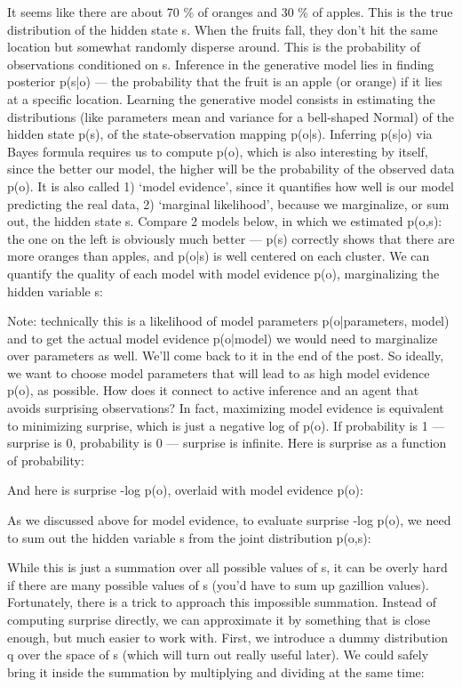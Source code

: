 \documentclass[12pt]{article}
\begin{document}
It seems like there are about 70 \% of oranges and 30 \% of apples. This is the true distribution of the hidden state s. When the fruits fall, they don’t hit the same location but somewhat randomly disperse around. This is the probability of observations conditioned on s. Inference in the generative model lies in finding posterior p(s|o) — the probability that the fruit is an apple (or orange) if it lies at a specific location. Learning the generative model consists in estimating the distributions (like parameters mean and variance for a bell-shaped Normal) of the hidden state p(s), of the state-observation mapping p(o|s). Inferring p(s|o) via Bayes formula requires us to compute p(o), which is also interesting by itself, since the better our model, the higher will be the probability of the observed data p(o). It is also called 1) ‘model evidence’, since it quantifies how well is our model predicting the real data, 2) ‘marginal likelihood’, because we marginalize, or sum out, the hidden state s. Compare 2 models below, in which we estimated p(o,s): the one on the left is obviously much better — p(s) correctly shows that there are more oranges than apples, and p(o|s) is well centered on each cluster. We can quantify the quality of each model with model evidence p(o), marginalizing the hidden variable s:

Note: technically this is a likelihood of model parameters p(o|parameters, model) and to get the actual model evidence p(o|model) we would need to marginalize over parameters as well. We'll come back to it in the end of the post.
So ideally, we want to choose model parameters that will lead to as high model evidence p(o), as possible. How does it connect to active inference and an agent that avoids surprising observations? In fact, maximizing model evidence is equivalent to minimizing surprise, which is just a negative log of p(o). If probability is 1 — surprise is 0, probability is 0 — surprise is infinite. Here is surprise as a function of probability:

And here is surprise -log p(o), overlaid with model evidence p(o):

As we discussed above for model evidence, to evaluate surprise -log p(o), we need to sum out the hidden variable s from the joint distribution p(o,s):

While this is just a summation over all possible values of s, it can be overly hard if there are many possible values of s (you’d have to sum up gazillion values). Fortunately, there is a trick to approach this impossible summation.
Instead of computing surprise directly, we can approximate it by something that is close enough, but much easier to work with. First, we introduce a dummy distribution q over the space of s (which will turn out really useful later). We could safely bring it inside the summation by multiplying and dividing at the same time:
\end{document}
